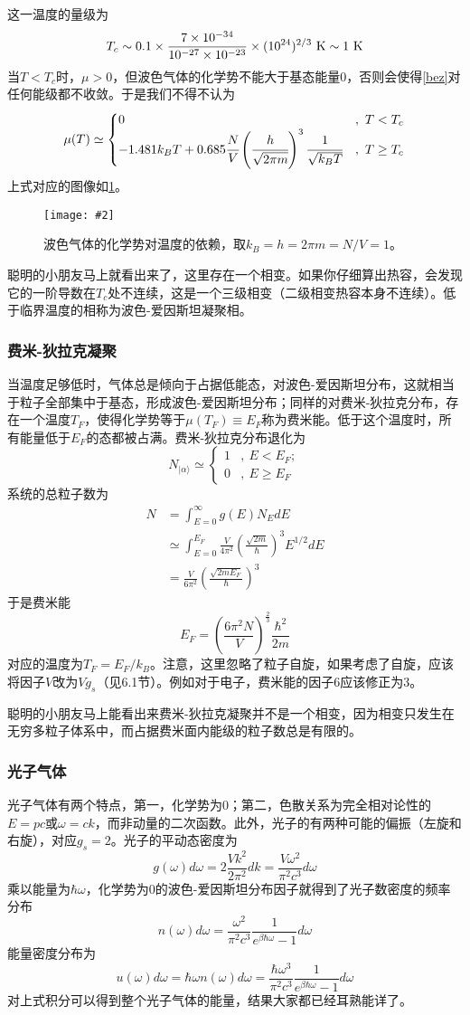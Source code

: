\documentclass[a4paper,11pt]{ctexart}
\newcommand{\beq}{\begin{equation}}
\newcommand{\eeq}{\end{equation}}
\newcommand{\bea}{\begin{equation}\begin{aligned}}
\newcommand{\eea}{\end{aligned}\end{equation}}
\newcommand{\red}{\color{red}}
\newcommand{\cpic}[2]{
\begin{center}
\texttt{[image: \#2]}
\end{center}
}
\newcommand{\cpicn}[3]
{
\begin{figure}[H]
\cpic{#1}{#2}
\caption{#3\label{#2}}
\end{figure}
}
\begin{document}
这一温度的量级为
\beq
T_c \sim 0.1 \times \frac{7 \times 10^{-34}}{10^{-27} \times 10^{-23}} \times (10^{24})^{2/3}\mathrm{\ K} \sim 1{\rm \ K}
\eeq
当$T<T_c$时，$\mu >0$，但波色气体的化学势不能大于基态能量0，否则会使得\cref{bez}对任何能级都不收敛。于是我们不得不认为
\beq
\mu(T) \simeq \begin{cases} 0 &,\ T<T_c \\
-1.481 k_B T + 0.685 \cfrac{N}{V} \left( \cfrac{h}{\sqrt{2\pi m}}\right)^3 \cfrac{1}{\sqrt{k_B T}}&,\ T\geq T_c
\end{cases}
\eeq
上式对应的图像如\cref{bec_mu}。
\cpicn{0.6}{bec_mu}{波色气体的化学势对温度的依赖，取$k_B = h = 2\pi m = N/V= 1$。}
聪明的小朋友马上就看出来了，这里存在一个相变。如果你仔细算出热容，会发现它的一阶导数在$T_c$处不连续，这是一个三级相变（二级相变热容本身不连续）。低于临界温度的相称为{\red 波色-爱因斯坦凝聚相}。
\subsubsection{费米-狄拉克凝聚}
当温度足够低时，气体总是倾向于占据低能态，对波色-爱因斯坦分布，这就相当于粒子全部集中于基态，形成波色-爱因斯坦分布；同样的对费米-狄拉克分布，存在一个温度$T_F$，使得化学势等于$\mu(T_F) \equiv E_F$称为{\red 费米能}。低于这个温度时，所有能量低于$E_F$的态都被占满。费米-狄拉克分布退化为
\beq
N_{|\alpha \rangle} \simeq \begin{cases} 1 &, \ E < E_F;\\
0 &,\ E\geq E_F
\end{cases}
\eeq
系统的总粒子数为
\bea
N &= \int_{E= 0}^{\infty} g(E) N_E dE \\
&\simeq \int_{E= 0}^{E_F} \frac{V}{4\pi^2} \left(\frac{\sqrt{2m}}{\hbar}\right)^3 E^{1/2} dE \\
&=\frac{V}{6\pi^2} \left(\frac{\sqrt{2mE_F}}{\hbar}\right)^3
\eea
于是费米能
\beq
E_F= \left( \frac{6\pi^2 N}{V} \right)^{\frac{2}{3}} \frac{\hbar^2}{2m}
\eeq
对应的温度为$T_F = E_F/k_B$。注意，这里忽略了粒子自旋，如果考虑了自旋，应该将因子$V$改为$Vg_s$（见6.1节）。例如对于电子，费米能的因子6应该修正为3。
\par
聪明的小朋友马上能看出来费米-狄拉克凝聚并不是一个相变，因为相变只发生在无穷多粒子体系中，而占据费米面内能级的粒子数总是有限的。

\subsubsection{光子气体}
光子气体有两个特点，第一，化学势为0；第二，色散关系为完全相对论性的$E = pc$或$\omega = c k$，而非动量的二次函数。此外，光子的有两种可能的偏振（左旋和右旋），对应$g_s = 2$。光子的平动态密度为
\beq
g(\omega)d\omega = 2\frac{Vk^2}{2\pi^2} dk = \frac{V\omega^2}{\pi^2 c^3} d\omega
\eeq
乘以能量为$\hbar \omega$，化学势为0的波色-爱因斯坦分布因子就得到了光子数密度的频率分布
\beq
n(\omega)d\omega = \frac{\omega^2}{\pi^2 c^3}\frac{1}{ e^{\beta\hbar \omega} - 1} d\omega
\eeq
能量密度分布为
\beq
u(\omega)d\omega = \hbar \omega n(\omega) d\omega = \frac{\hbar \omega^3}{\pi^2 c^3}\frac{1}{ e^{\beta\hbar \omega} - 1} d\omega
\eeq
对上式积分可以得到整个光子气体的能量，结果大家都已经耳熟能详了。
\end{document}
